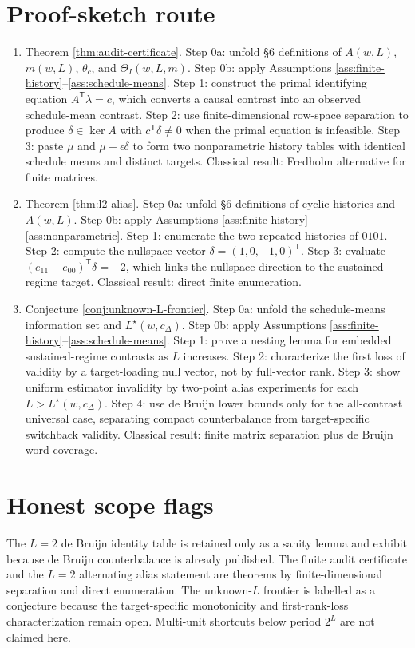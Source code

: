 \documentclass[11pt]{article}
\newcommand{\transpose}{\mathsf{T}}
\theoremstyle{definition}
\theoremstyle{plain}
\theoremstyle{remark}
\begin{document}
\section{Proof-sketch route}
\begin{enumerate}[leftmargin=2em]
\item Theorem \ref{thm:audit-certificate}. Step 0a: unfold \S6 definitions of \(A(w,L)\), \(m(w,L)\), \(\theta_c\), and \(\Theta_I(w,L,m)\). Step 0b: apply Assumptions \ref{ass:finite-history}--\ref{ass:schedule-means}. Step 1: construct the primal identifying equation \(A^\transpose\lambda=c\), which converts a causal contrast into an observed schedule-mean contrast. Step 2: use finite-dimensional row-space separation to produce \(\delta\in\ker A\) with \(c^\transpose\delta\neq0\) when the primal equation is infeasible. Step 3: paste \(\mu\) and \(\mu+\epsilon\delta\) to form two nonparametric history tables with identical schedule means and distinct targets. Classical result: Fredholm alternative for finite matrices.
\item Theorem \ref{thm:l2-alias}. Step 0a: unfold \S6 definitions of cyclic histories and \(A(w,L)\). Step 0b: apply Assumptions \ref{ass:finite-history}--\ref{ass:nonparametric}. Step 1: enumerate the two repeated histories of \(0101\). Step 2: compute the nullspace vector \(\delta=(1,0,-1,0)^\transpose\). Step 3: evaluate \((e_{11}-e_{00})^\transpose\delta=-2\), which links the nullspace direction to the sustained-regime target. Classical result: direct finite enumeration.
\item Conjecture \ref{conj:unknown-L-frontier}. Step 0a: unfold the schedule-means information set and \(L^\star(w,c_\Delta)\). Step 0b: apply Assumptions \ref{ass:finite-history}--\ref{ass:schedule-means}. Step 1: prove a nesting lemma for embedded sustained-regime contrasts as \(L\) increases. Step 2: characterize the first loss of validity by a target-loading null vector, not by full-vector rank. Step 3: show uniform estimator invalidity by two-point alias experiments for each \(L>L^\star(w,c_\Delta)\). Step 4: use de Bruijn lower bounds only for the all-contrast universal case, separating compact counterbalance from target-specific switchback validity. Classical result: finite matrix separation plus de Bruijn word coverage.
\end{enumerate}

\section{Honest scope flags}
The \(L=2\) de Bruijn identity table is retained only as a sanity lemma and exhibit because de Bruijn counterbalance is already published. The finite audit certificate and the \(L=2\) alternating alias statement are theorems by finite-dimensional separation and direct enumeration. The unknown-\(L\) frontier is labelled as a conjecture because the target-specific monotonicity and first-rank-loss characterization remain open. Multi-unit shortcuts below period \(2^L\) are not claimed here.
\end{document}
